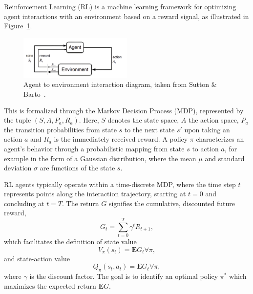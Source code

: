\documentclass[preprint, 12pt]{elsarticle}
\begin{document}
Reinforcement Learning (RL) is a machine learning framework for optimizing agent interactions with an environment based on a reward signal, as illustrated in Figure~\ref{fig: AgentEnvInteraction}.
\begin{figure}[ht]
    \centering
    \includegraphics[width=0.5\textwidth]{Figures/AgentEnvInteraction_highres.png}
    \caption{Agent to environment interaction diagram, taken from Sutton \& Barto~\cite{Sutton}.}
    \label{fig: AgentEnvInteraction}
\end{figure}

This is formalized through the Markov Decision Process (MDP), represented by the tuple $(S, A, P_a, R_a)$. Here, $S$ denotes the state space, $A$ the action space, $P_a$ the transition probabilities from state $s$ to the next state $s'$ upon taking an action $a$ and $R_a$ is the immediately received reward.
A policy $\pi$ characterizes an agent's behavior through a probabilistic mapping from state $s$ to action $a$, for example in the form of a Gaussian distribution, where the mean $\mu$ and standard deviation $\sigma$ are functions of the state $s$.

RL agents typically operate within a time-discrete MDP, where the time step $t$ represents points along the interaction trajectory, starting at $t=0$ and concluding at $t=T$. The return $G$ signifies the cumulative, discounted future reward,
\begin{equation}
    \label{eq:Return_Alex3_Alex3}
        G_t = \sum_{t=0}^{T} \gamma^t R_{t+1},
\end{equation}
which facilitates the definition of state value %
\begin{equation}
    \label{eq:StateValue_Alex3}
    V_{\pi}(s_t) = \mathbf{E}G_t  \forall \pi,
\end{equation}
and state-action value %
\begin{equation}
    \label{eq:ActionValue}
    Q_{\pi}(s_t, a_t) = \mathbf{E}G_t \forall \pi,
\end{equation}
where $\gamma$ is the discount factor.
The goal is to identify an optimal policy $\pi^*$ which maximizes the expected return $\mathbf{E}G$.
\end{document}
